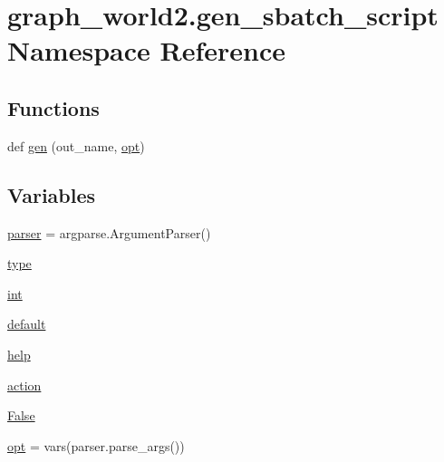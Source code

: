 \hypertarget{namespacegraph__world2_1_1gen__sbatch__script}{}\section{graph\+\_\+world2.\+gen\+\_\+sbatch\+\_\+script Namespace Reference}
\label{namespacegraph__world2_1_1gen__sbatch__script}
\subsection*{Functions}
\begin{DoxyCompactItemize}
\item 
def \hyperlink{namespacegraph__world2_1_1gen__sbatch__script_a39f73c9b077f4bb92853e7033e35c1b1}{gen} (out\+\_\+name, \hyperlink{namespacegraph__world2_1_1gen__sbatch__script_a8bebb42a9387f9a04c4414fca68bb6c2}{opt})
\end{DoxyCompactItemize}
\subsection*{Variables}
\begin{DoxyCompactItemize}
\item 
\hyperlink{namespacegraph__world2_1_1gen__sbatch__script_a35d72fb0a48043fbb762ae06dee52ed8}{parser} = argparse.\+Argument\+Parser()
\item 
\hyperlink{namespacegraph__world2_1_1gen__sbatch__script_af55e4850ba1b0390ce5d5c1c88fbc43c}{type}
\item 
\hyperlink{namespacegraph__world2_1_1gen__sbatch__script_a9a98e06b860a43c4f37a22688720af47}{int}
\item 
\hyperlink{namespacegraph__world2_1_1gen__sbatch__script_a3763c39f7acd6a0329c59ed4ca14a63a}{default}
\item 
\hyperlink{namespacegraph__world2_1_1gen__sbatch__script_afaa4d6a02b2c7127d16d0830a0b16fa3}{help}
\item 
\hyperlink{namespacegraph__world2_1_1gen__sbatch__script_ae1cfc2209c3d556ec6724bd1c913b71a}{action}
\item 
\hyperlink{namespacegraph__world2_1_1gen__sbatch__script_ac5ddd33f5082846123a11eea2524ba43}{False}
\item 
\hyperlink{namespacegraph__world2_1_1gen__sbatch__script_a8bebb42a9387f9a04c4414fca68bb6c2}{opt} = vars(parser.\+parse\+\_\+args())
\end{DoxyCompactItemize}


